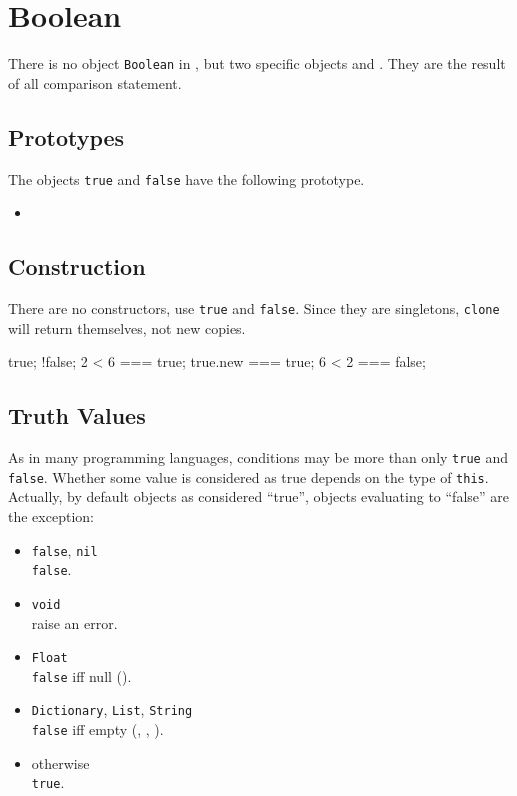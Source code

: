 \section{Boolean}

There is no object \lstinline|Boolean| in \us, but two specific
objects  and .  They are the result of
all comparison statement.


\subsection{Prototypes}

The objects \lstinline|true| and \lstinline|false| have the following
prototype.

\begin{itemize}
\item {}
\end{itemize}

\subsection{Construction}

There are no constructors, use \lstinline|true| and \lstinline|false|.
Since they are singletons, \lstinline|clone| will return themselves,
not new copies.

\begin{urbiassert}
true;
!false;
2 < 6 === true;
true.new === true;
6 < 2 === false;
\end{urbiassert}

\subsection{Truth Values}
\label{sec:truth}

As in many programming languages, conditions may be more than only
\lstinline|true| and \lstinline|false|.  Whether some value is
considered as true depends on the type of \lstinline|this|.  Actually,
by default objects as considered ``true'', objects evaluating to
``false'' are the exception:
\begin{itemize}
\item \lstinline|false|, \lstinline|nil|\\
  \lstinline|false|.
\item \lstinline|void|\\
  raise an error.
\item \lstinline|Float|\\
  \lstinline|false| iff null ().
\item \lstinline|Dictionary|, \lstinline|List|,  \lstinline|String|\\
  \lstinline|false| iff empty (,
  , ).
\item otherwise\\
  \lstinline|true|.
\end{itemize}

